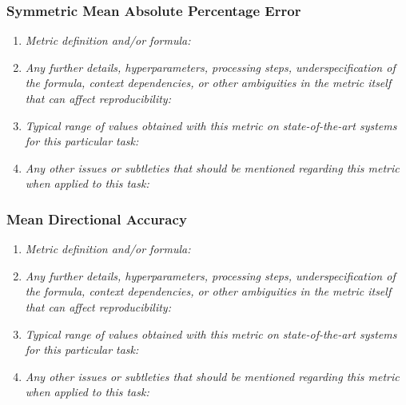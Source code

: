 \documentclass[a4paper,11pt]{article}
\begin{document}
        \subsubsection{Symmetric Mean Absolute Percentage Error}
            \begin{enumerate}[label=\alph*.]
                \item \textit{Metric definition and/or formula:}
                \bigskip
                \item \textit{Any further details, hyperparameters, processing steps, underspecification of the formula, context dependencies, or other ambiguities in the metric itself that can affect reproducibility:}
                \bigskip
                \item \textit{Typical range of values obtained with this metric on state-of-the-art systems for this particular task:}
                \bigskip
                \item \textit{Any other issues or subtleties that should be mentioned regarding this metric when applied to this task:}
                \bigskip
            \end{enumerate}
        \subsubsection{Mean Directional Accuracy}
            \begin{enumerate}[label=\alph*.]
                \item \textit{Metric definition and/or formula:}
                \bigskip
                \item \textit{Any further details, hyperparameters, processing steps, underspecification of the formula, context dependencies, or other ambiguities in the metric itself that can affect reproducibility:}
                \bigskip
                \item \textit{Typical range of values obtained with this metric on state-of-the-art systems for this particular task:}
                \bigskip
                \item \textit{Any other issues or subtleties that should be mentioned regarding this metric when applied to this task:}
                \bigskip
            \end{enumerate}
\end{document}
